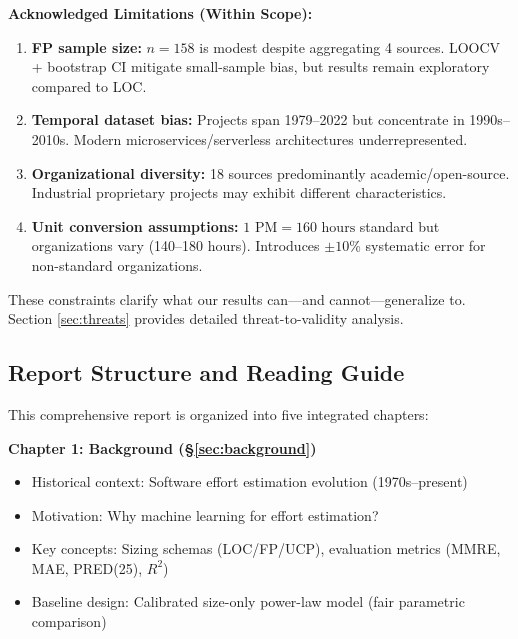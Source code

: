 \documentclass[11pt,a4paper]{article}
\begin{document}
\textbf{Acknowledged Limitations (Within Scope):}

\begin{enumerate}
    \item \textbf{FP sample size:} $n = 158$ is modest despite aggregating 4 sources. LOOCV + bootstrap CI mitigate small-sample bias, but results remain exploratory compared to LOC.
    
    \item \textbf{Temporal dataset bias:} Projects span 1979--2022 but concentrate in 1990s--2010s. Modern microservices/serverless architectures underrepresented.
    
    \item \textbf{Organizational diversity:} 18 sources predominantly academic/open-source. Industrial proprietary projects may exhibit different characteristics.
    
    \item \textbf{Unit conversion assumptions:} $1 \text{ PM} = 160 \text{ hours}$ standard but organizations vary (140--180 hours). Introduces $\pm 10$\% systematic error for non-standard organizations.
\end{enumerate}

These constraints clarify what our results can---and cannot---generalize to. Section \ref{sec:threats} provides detailed threat-to-validity analysis.

\subsection{Report Structure and Reading Guide}

This comprehensive report is organized into five integrated chapters:

\textbf{Chapter 1: Background (\S\ref{sec:background})}
\begin{itemize}
    \item Historical context: Software effort estimation evolution (1970s--present)
    \item Motivation: Why machine learning for effort estimation?
    \item Key concepts: Sizing schemas (LOC/FP/UCP), evaluation metrics (MMRE, MAE, PRED(25), $R^2$)
    \item Baseline design: Calibrated size-only power-law model (fair parametric comparison)
\end{itemize}
\end{document}
